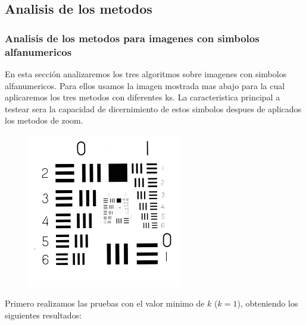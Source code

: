 \subsection{Analisis de los metodos}
\subsubsection{Analisis de los metodos para imagenes con simbolos alfanumericos}
En esta sección analizaremos los tres algoritmos sobre imagenes con simbolos alfanumericos. Para ellos usamos la imagen mostrada mas abajo para la cual aplicaremos los tres metodos con diferentes ks. La caracteristica principal a testear sera la capacidad de dicernimiento de estos simbolos despues de aplicados los metodos de zoom.

\begin{figure}[H]
\centering
\includegraphics[scale=0.50]{fotos/alfanum/orig.png}
\end{figure}

Primero realizamos las pruebas con el valor minimo de $k$ ($k=1$), obteniendo los siguientes resultados:


